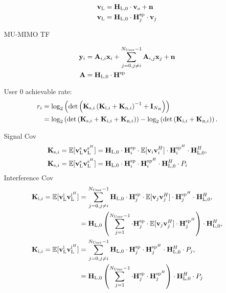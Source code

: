\begin{align}
\mathbf{v}_\text{L} &= \mathbf{H}_\text{L,0}\cdot\mathbf{v}_o + \mathbf{n}\\
\mathbf{v}_\text{L} &= \mathbf{H}_\text{L,0}\cdot\mathbf{H}_{j}^{\text{sp}}\cdot\mathbf{v}_j
\end{align}



MU-MIMO TF

\begin{align}
\label{eq:nossek_transf}
\mathbf{y}_i &= \mathbf{A}_{i,i}\mathbf{x}_i + 
	\sum_{j=0,j\neq i}^{N_\text{User}-1} \mathbf{A}_{i,j}\mathbf{x}_j + \mathbf{n}\\
\mathbf{A} &= \mathbf{H}_\text{L,0}\cdot\mathbf{H}^{\text{sp}}
\end{align}

User 0 achievable rate:
\begin{align}
\label{eq:achiev_rate}
r_i &= \text{log}_2\left(\text{det}\left(\mathbf{K}_{\text{s},i}\left(\mathbf{K}_{\text{i},i}+\mathbf{K}_{\text{n},i}\right)^{-1}+\mathbf{I}_{N_R}\right)\right)\\
 &=\text{log}_2\left(
	\text{det}\left(\mathbf{K}_{\text{s},i}+
		\mathbf{K}_{\text{i},i}+\mathbf{K}_{\text{n},i}\right)\right) -
	\text{log}_2\left(\text{det}\left(\mathbf{K}_{\text{i},i}+\mathbf{K}_{\text{n},i}\right)\right).
\end{align}

Signal Cov
\begin{align}
\mathbf{K}_{\text{s},i}=\mathbb{E}[\mathbf{v}_\text{L}^\text{s}\mathbf{v}_\text{L}^{\text{s}^H}] &= 
	\mathbf{H}_\text{L,0} \cdot \mathbf{H}_{i}^{\text{sp}} \cdot 
	\mathbb{E}[\mathbf{v}_{i}\mathbf{v}_{i}^H] \cdot 
	\mathbf{H}_{i}^{\text{sp}^H} \cdot \mathbf{H}_\text{L,0}^H,\\
\mathbf{K}_{\text{s},i}=\mathbb{E}[\mathbf{v}_\text{L}^\text{s}\mathbf{v}_\text{L}^{\text{s}^H}] &= 
	\mathbf{H}_\text{L,0} \cdot \mathbf{H}_{i}^{\text{sp}} \cdot  
	\mathbf{H}_{i}^{\text{sp}^H} \cdot \mathbf{H}_\text{L,0}^H\cdot P_i
\end{align}
Interference Cov
\begin{align}
\mathbf{K}_{\text{i},i}=\mathbb{E}[\mathbf{v}_\text{L}^\text{i}\mathbf{v}_\text{L}^{\text{i}^H}] &= \sum_{j=0,j\neq i}^{N_\text{User}-1} 
	\mathbf{H}_\text{L,0} \cdot \mathbf{H}_{j}^{\text{sp}} \cdot 
	\mathbb{E}[\mathbf{v}_{j}\mathbf{v}_{j}^H] \cdot 
	\mathbf{H}_{j}^{\text{sp}^H} \cdot \mathbf{H}_\text{L,0}^H,\\
	&= \mathbf{H}_\text{L,0} \left(\sum_{j=1}^{N_\text{User}-1} 
	\cdot \mathbf{H}_{j}^{\text{sp}} \cdot 
	\mathbb{E}[\mathbf{v}_{j}\mathbf{v}_{j}^H] \cdot 
	\mathbf{H}_{j}^{\text{sp}^H}\right) \cdot \mathbf{H}_\text{L,0}^H,\\
\mathbf{K}_{\text{i},i}=\mathbb{E}[\mathbf{v}_\text{L}^\text{i}\mathbf{v}_\text{L}^{\text{i}^H}] &= \sum_{j=0,j\neq i}^{N_\text{User}-1} 
	\mathbf{H}_\text{L,0} \cdot \mathbf{H}_{j}^{\text{sp}} \cdot 
	\mathbf{H}_{j}^{\text{sp}^H} \cdot \mathbf{H}_\text{L,0}^H\cdot P_j,\\
	&= \mathbf{H}_\text{L,0} \left(\sum_{j=1}^{N_\text{User}-1} 
	\cdot \mathbf{H}_{j}^{\text{sp}} \cdot
	\mathbf{H}_{j}^{\text{sp}^H}\right) \cdot \mathbf{H}_\text{L,0}^H\cdot P_j
\end{align}

